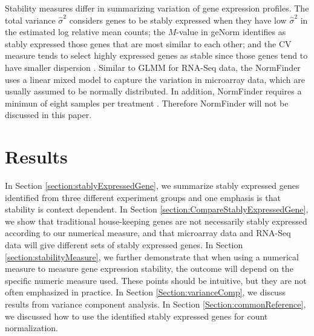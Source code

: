 \documentclass[11pt, a4paper]{article}
\begin{document}
Stability measures differ in summarizing variation of gene expression profiles. The total variance $\hat{\sigma}^2$ considers genes to be stably expressed when they have low $\hat{\sigma}^2$ in the estimated log relative mean
counts; the $M$-value in geNorm identifies as stably
expressed those genes that are most similar to each other; and the CV measure
\citep{czechowski2005genome} tends to select highly expressed genes as stable
since those genes tend to have smaller dispersion \citep{hruz2011refgenes}. 
Similar to GLMM for RNA-Seq data, the NormFinder uses a linear mixed model to capture the variation in microarray data, which are usually assumed to be normally distributed. In addition, NormFinder requires a minimun of eight samples per treatment \citep{andersen2004normalization}. Therefore NormFinder will not be discussed in this paper. %



\section{Results} \label{section:Results}
In Section \ref{section:stablyExpressedGene}, we summarize stably expressed genes identified from three
different experiment groups and one emphasis is that stability is
context dependent. In Section \ref{section:CompareStablyExpressedGene}, we show that traditional house-keeping
genes are not necessarily stably expressed according to our numerical measure, 
and that microarray data and RNA-Seq data will give different sets of stably
expressed genes.  In Section \ref{section:stabilityMeasure}, we further demonstrate that when using a
numerical measure to measure gene expression stability, the outcome will
depend on the specific numeric measure used.  These points should be
intuitive, but they are not often emphasized in practice.  In Section
\ref{Section:varianceComp}, we discuss results from variance component analysis. In Section
\ref{Section:commonReference}, we discussed how to use the identified stably
expressed genes for count normalization.
\end{document}

